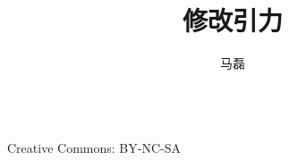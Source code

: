\documentclass[12pt,a4paper]{article}
\begin{document}
\title{修改引力}
\author{\small 马磊}
\maketitle




\begin{center}
 \\
Creative Commons: BY-NC-SA
\end{center}


\newcommand{\dd}{\mathrm d}
\newcommand{\HH}{\mathcal H}
\newenvironment{eqnset}
{\begin{equation}\left \bracevert \begin{array}{l}}
{\end{array} \right. \end{equation}}

\newenvironment{eqn}
{\begin{equation}\left \bracevert \begin{array}{l}}
{\end{array} \right. \end{equation}}




\vspace{2ex}
\end{document}
